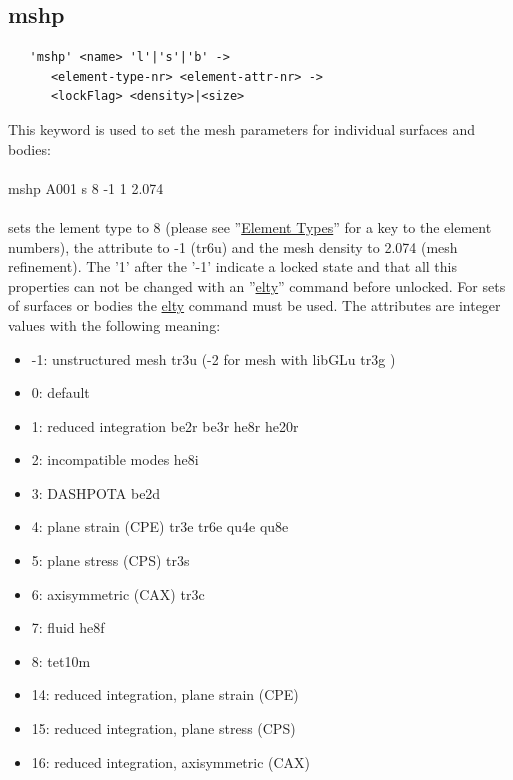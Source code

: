 \documentclass{article}
\providecommand{\htmlref}[2]{\hyperref[#2]{#1}}
\begin{document}
\subsection{\label{mshp}mshp}
\begin{verbatim}
   'mshp' <name> 'l'|'s'|'b' ->
      <element-type-nr> <element-attr-nr> ->
      <lockFlag> <density>|<size>
\end{verbatim}
This keyword is used to set the mesh parameters for individual surfaces and bodies:\\\\mshp A001 s 8 -1 1 2.074\\\\sets the lement type to 8 (please see ''\htmlref{Element Types}{Element Types}'' for a key to the element numbers), the attribute to -1 (tr6u) and the mesh density to 2.074 (mesh refinement). The '1' after the '-1' indicate a locked state and that all this properties can not be changed with an ''\htmlref{elty}{elty}'' command before unlocked. For sets of surfaces or bodies the \htmlref{elty}{elty} command must be used. The attributes are integer values with the following meaning:
\begin{itemize}
\item  -1: unstructured mesh tr3u (-2 for mesh with libGLu tr3g )
\item   0: default
\item   1: reduced integration be2r be3r he8r he20r
\item   2: incompatible modes he8i
\item   3: DASHPOTA be2d
\item   4: plane strain (CPE) tr3e tr6e qu4e qu8e
\item   5: plane stress (CPS) tr3s
\item   6: axisymmetric  (CAX) tr3c
\item   7: fluid he8f
\item   8: tet10m
\item   14: reduced integration, plane strain (CPE)
\item   15: reduced integration, plane stress (CPS)
\item   16: reduced integration, axisymmetric  (CAX)
\end{itemize}
 
\end{document}
